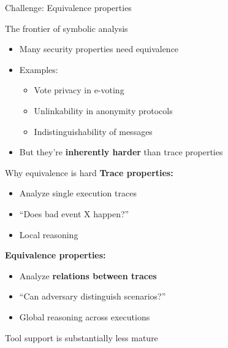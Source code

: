 \documentclass[aspectratio=169, lualatex, handout]{beamer}
\begin{document}
\begin{frame}{Challenge: Equivalence properties}
	\begin{center}
		\Large
		The frontier of symbolic analysis
	\end{center}
	\vspace{1em}
	\begin{itemize}
		\item Many security properties need equivalence
		\item Examples:
		      \begin{itemize}
			      \item Vote privacy in e-voting
			      \item Unlinkability in anonymity protocols
			      \item Indistinguishability of messages
		      \end{itemize}
		\item But they're \textbf{inherently harder} than trace properties
	\end{itemize}
\end{frame}

\begin{frame}{Why equivalence is hard}
	\textbf{Trace properties:}
	\begin{itemize}
		\item Analyze single execution traces
		\item ``Does bad event X happen?''
		\item Local reasoning
	\end{itemize}
	\vspace{0.5em}
	\textbf{Equivalence properties:}
	\begin{itemize}
		\item Analyze \textbf{relations between traces}
		\item ``Can adversary distinguish scenarios?''
		\item Global reasoning across executions
	\end{itemize}
	\vspace{1em}
	\begin{center}
		Tool support is substantially less mature
	\end{center}
\end{frame}
\end{document}
